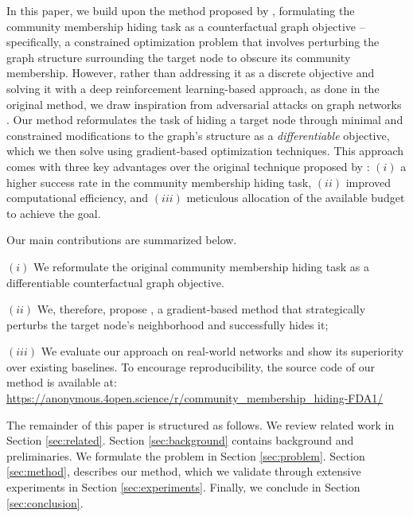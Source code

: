 In this paper, we build upon the method proposed by \citet{bernini2024kdd}, formulating the community membership hiding task as a counterfactual graph objective -- specifically, a constrained optimization problem that involves perturbing the graph structure surrounding the target node to obscure its community membership.
However, rather than addressing it as a discrete objective and solving it with a deep reinforcement learning-based approach, as done in the original method, we draw inspiration from adversarial attacks on graph networks \cite{trappolini2023savage}. Our method reformulates the task of hiding a target node through minimal and constrained modifications to the graph's structure as a \textit{differentiable} objective, which we then solve using gradient-based optimization techniques. 
This approach comes with three key advantages over the original technique proposed by \citet{bernini2024kdd}: $(i)$ a higher success rate in the community membership hiding task, $(ii)$ improved computational efficiency, and $(iii)$ meticulous allocation of the available budget to achieve the goal.

Our main contributions are summarized below.

    $(i)$ We reformulate the original community membership hiding task as a differentiable counterfactual graph objective.
    
    $(ii)$ We, therefore, propose \method{}, a gradient-based method that strategically perturbs the target node's neighborhood and successfully hides it;
    
    $(iii)$ We evaluate our approach on real-world networks and show its superiority over existing baselines. To encourage reproducibility, the source code of our method is available at: {\footnotesize\url{https://anonymous.4open.science/r/community\_membership\_hiding-FDA1/}}

The remainder of this paper is structured as follows. 
We review related work in Section \ref{sec:related}. Section \ref{sec:background} contains background and preliminaries. We formulate the problem in Section \ref{sec:problem}. Section \ref{sec:method}, describes our method, which we validate through extensive experiments in Section \ref{sec:experiments}. Finally, we conclude in Section \ref{sec:conclusion}.